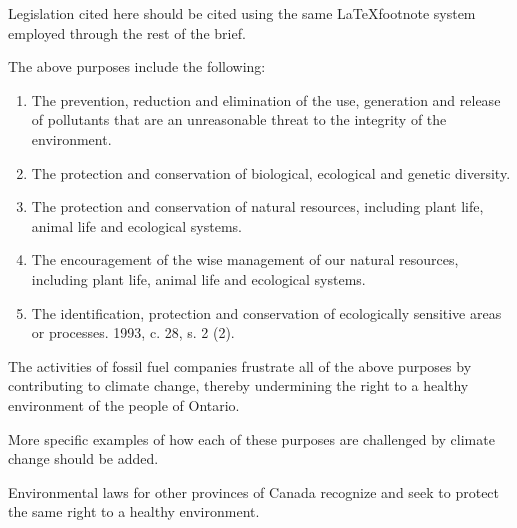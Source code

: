 \begin{vcom}
	Legislation cited here should be cited using the same \LaTeX footnote system employed through the rest of the brief.
\end{vcom}


The above purposes include the following:
\begin{enumerate}
	\item The prevention, reduction and elimination of the use, generation and release of pollutants that are an unreasonable threat to the integrity of the environment.
	\item The protection and conservation of biological, ecological and genetic diversity.
	\item The protection and conservation of natural resources, including plant life, animal life and ecological systems.
	\item The encouragement of the wise management of our natural resources, including plant life, animal life and ecological systems.
	\item The identification, protection and conservation of ecologically sensitive areas or processes.  1993, c. 28, s. 2 (2). 
\end{enumerate}



The activities of fossil fuel companies frustrate all of the above purposes by contributing to climate change, thereby undermining the right to a healthy environment of the people of Ontario.

\begin{vcom}
	More specific examples of how each of these purposes are challenged by climate change should be added.
\end{vcom}


Environmental laws for other provinces of Canada recognize and seek to protect the same right to a healthy environment.  



